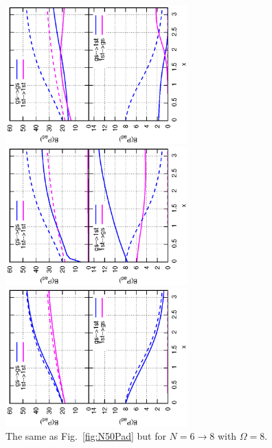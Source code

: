 \documentclass[%
superscriptaddress,
preprint,
showpacs,
nofootinbib,
amsmath,amssymb,
aps,
prc,
floatfix ]%
{revtex4-1}
\begin{document}
\begin{figure}[htbp]
 \begin{minipage}{0.3\hsize}
 \begin{center}
  \includegraphics[width=70mm,angle=-90]{images/N8Pad_CQ.eps}
 \end{center}
 \captionsetup{labelformat=empty,labelsep=none}
 \end{minipage}
 \begin{minipage}{0.3\hsize}
 \begin{center}
  \includegraphics[width=70mm,angle=-90]{images/N8Pad_FD.eps}
 \end{center}
 \captionsetup{labelformat=empty,labelsep=none}
 \end{minipage}
 \begin{minipage}{0.3\hsize}
 \begin{center}
  \includegraphics[width=70mm,angle=-90]{images/N8Pad_SPA.eps}
 \end{center}
 \captionsetup{labelformat=empty,labelsep=none}
 \end{minipage}
	\caption{The same as Fig.~\ref{fig:N50Pad} but for $N=6\rightarrow 8$
	with $\Omega=8$.
}
 \label{fig:N8Pad}
\end{figure}
\end{document}
